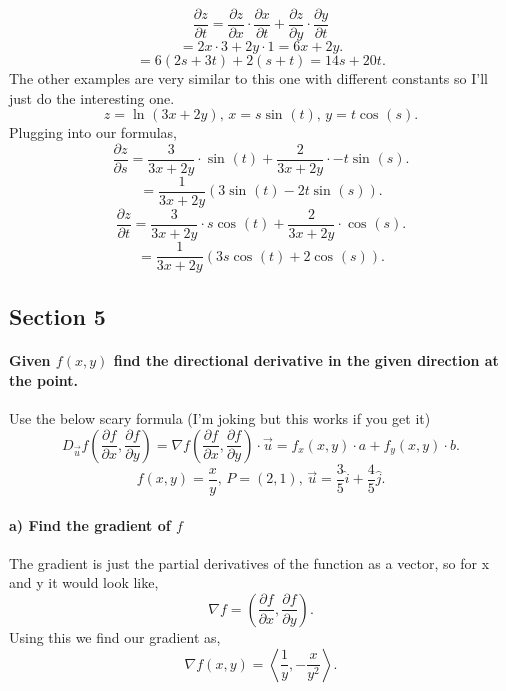 \documentclass{report}
\begin{document}
\begin{multicols}{2}
\begin{equation}
\frac{ \partial z}{\partial t} = \frac{ \partial z}{\partial x} \cdot \frac{ \partial x}{\partial t} + \frac{ \partial z}{\partial y} \cdot \frac{ \partial y}{\partial t} 
\end{equation}
\[
=2x\cdot 3+2y\cdot 1 = 6x+2y
.\] 
\[
=6\left( 2s+3t \right) +2\left( s+t \right) = 14s+20t
.\] 
The other examples are very similar to this one with different constants so I'll just do the interesting one. 
\[
z=\ln^{  } \left( 3x+2y \right) \text{, }x=s \sin^{  } \left( t \right) \text{, }y=t\cos^{  } \left( s \right) 
.\] 
Plugging into our formulas,
\[
\frac{ \partial z}{\partial s} = \frac{ 3 }{ 3x+2y } \cdot \sin^{  } \left( t \right) + \frac{ 2 }{ 3x+2y } \cdot -t\sin^{  } \left( s \right) 
.\] 
\[
=\frac{ 1 }{ 3x+2y } \left( 3\sin^{  } \left( t \right) -2t\sin^{  } \left( s \right)  \right) 
.\] 
\[
\frac{ \partial z}{\partial t} = \frac{ 3 }{ 3x+2y } \cdot s\cos^{  } \left( t \right) +\frac{ 2 }{ 3x+2y } \cdot \cos^{  } \left( s \right) 
.\] 
\[
= \frac{ 1 }{ 3x+2y } \left( 3s\cos^{  } \left( t \right) +2\cos^{  } \left( s \right)  \right) 
.\] 
\subsection{Section 5}%
\label{sub: Section 5 }
\paragraph{Given $ f\left( x,y \right)  $ find the directional derivative in the given direction at the point. \\}
Use the below scary formula (I'm joking but this works if you get it)
\[
D_{ \vec{ u } }f\left( \frac{ \partial f}{\partial x} , \frac{ \partial f}{\partial y}  \right) = \nabla f\left( \frac{ \partial f}{\partial x} , \frac{ \partial f}{\partial y}  \right) \cdot \vec{ u } = f_x\left( x,y \right) \cdot a + f_y\left( x,y \right) \cdot b
.\] 
\[
	f\left( x,y \right) = \frac{ x }{ y }\text{, }P=\left( 2,1 \right)\text{, } \vec{ u } = \frac{ 3 }{ 5 } \hat{i} + \frac{ 4 }{ 5 } \hat{j}
.\] 
\paragraph{a) Find the gradient of $ f $}
The gradient is just the partial derivatives of the function as a vector, so for x and y it would look like,
\begin{equation}
\nabla f = \left( \frac{ \partial f}{\partial x} , \frac{ \partial f}{\partial y}  \right) 
.\end{equation}
Using this we find our gradient as,
\[
\nabla f\left( x,y \right) = \left< \frac{ 1 }{ y } , -\frac{ x }{ y^2 }  \right>
.\] 

\end{multicols}
\end{document}
